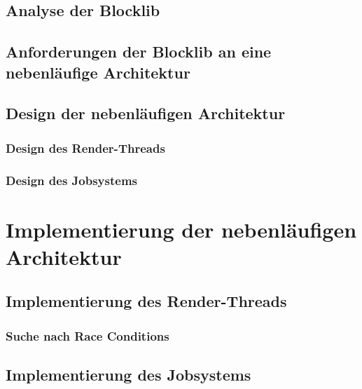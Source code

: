 \documentclass[12pt,a4paper,listof=toc,parskip=half,numbers=noenddot,abstract=true]{scrartcl}
\begin{document}
\subsection{Analyse der Blocklib}\label{sec:blocklibAnalyse}


\subsection{Anforderungen der Blocklib an eine nebenläufige Architektur}\label{sec:anforderungen}


\subsection{Design der nebenläufigen Architektur}

\subsubsection{Design des Render-Threads}\label{sec:desgignRender-Thread}

\subsubsection{Design des Jobsystems}\label{sec:designJobsystem}


\clearpage
\section{Implementierung der nebenläufigen Architektur}\label{kap:Implementierung}

\subsection{Implementierung des Render-Threads}


\subsubsection{Suche nach Race Conditions}\label{sec:searchRace}

\subsection{Implementierung des Jobsystems}

\end{document}
